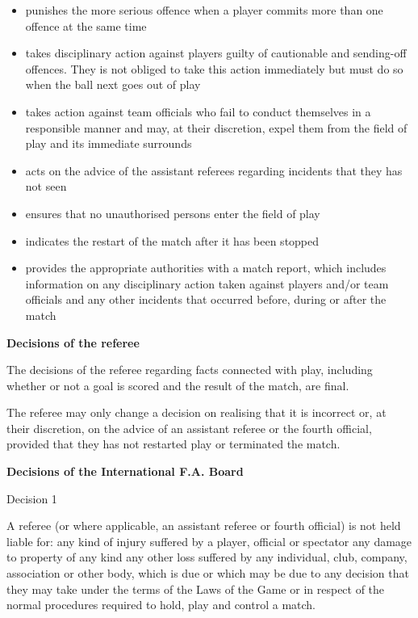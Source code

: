\begin{itemize}
\item punishes the more serious offence when a player commits more than one offence at the same time
\item takes disciplinary action against players guilty of cautionable and sending-off offences. They is not obliged to take this action immediately but must do so when the ball next goes out of play 
\item takes action against team officials who fail to conduct themselves in a responsible manner and may, at their discretion, expel them from the field of play and its immediate surrounds 
\item acts on the advice of the assistant referees regarding incidents that they has not seen 
\item ensures that no unauthorised persons enter the field of play 
\item indicates the restart of the match after it has been stopped 
\item provides the appropriate authorities with a match report, which includes information on any disciplinary action taken against players and/or team officials and any other incidents that occurred before, during or after
the match 
\end{itemize}

\bigskip

{\bfseries Decisions of the referee}

\headlinebox

The decisions of the referee regarding facts connected with play, including whether or not a goal is scored and the result of the match, are final.

\bigskip

The referee may only change a decision on realising that it is incorrect or, at their discretion, on the advice of an assistant referee or the fourth official, provided that they has not restarted play or terminated the match.


\clearpage
{\bfseries Decisions of the International F.A. Board }

\headlinebox

Decision 1

A referee (or where applicable, an assistant referee or fourth official) is not held liable for: any kind of injury suffered by a player, official or spectator any damage to property of any kind any other loss suffered by any individual, club, company, association or other body, which is due or which may be due to any decision that they may take under the terms of the Laws of the Game or in respect of the normal procedures required to hold, play and control a match.

